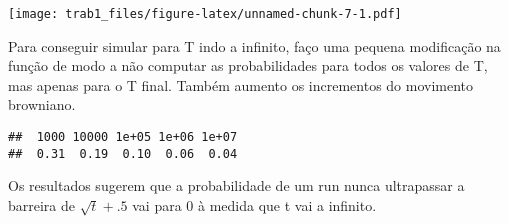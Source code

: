 \documentclass[]{article}
\newenvironment{Shaded}{\begin{snugshade}}{\end{snugshade}}
\newcommand{\KeywordTok}[1]{\textcolor[rgb]{0.13,0.29,0.53}{\textbf{#1}}}
\newcommand{\DataTypeTok}[1]{\textcolor[rgb]{0.13,0.29,0.53}{#1}}
\newcommand{\DecValTok}[1]{\textcolor[rgb]{0.00,0.00,0.81}{#1}}
\newcommand{\StringTok}[1]{\textcolor[rgb]{0.31,0.60,0.02}{#1}}
\newcommand{\CommentTok}[1]{\textcolor[rgb]{0.56,0.35,0.01}{\textit{#1}}}
\newcommand{\ControlFlowTok}[1]{\textcolor[rgb]{0.13,0.29,0.53}{\textbf{#1}}}
\newcommand{\OperatorTok}[1]{\textcolor[rgb]{0.81,0.36,0.00}{\textbf{#1}}}
\newcommand{\NormalTok}[1]{#1}
\begin{document}
\texttt{[image: trab1\_files/figure-latex/unnamed-chunk-7-1.pdf]}

Para conseguir simular para T indo a infinito, faço uma pequena
modificação na função de modo a não computar as probabilidades para
todos os valores de T, mas apenas para o T final. Também aumento os
incrementos do movimento browniano.

\begin{Shaded}
\end{Shaded}

\begin{verbatim}
##  1000 10000 1e+05 1e+06 1e+07 
##  0.31  0.19  0.10  0.06  0.04
\end{verbatim}

Os resultados sugerem que a probabilidade de um run nunca ultrapassar a
barreira de \(\sqrt t + .5\) vai para 0 à medida que t vai a infinito.
\end{document}
